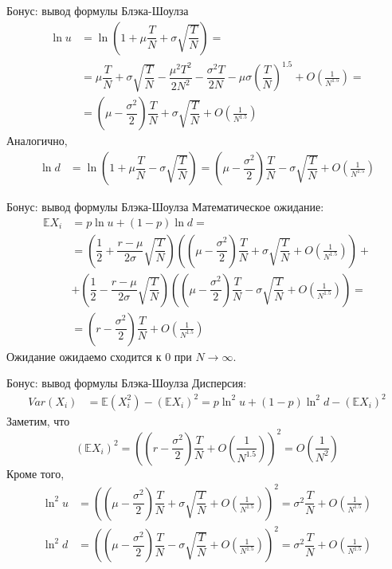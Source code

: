 \documentclass[pdf,12pt]{beamer}
\begin{document}
\begin{frame}{Бонус: вывод формулы Блэка-Шоулза}
\begin{align*}
\ln u &= \ln \left(1 + \mu \dfrac{T}{N} + \sigma\sqrt{\dfrac{T}{N}} \right) = \\ 
&=
\mu \dfrac{T}{N} + \sigma\sqrt{\dfrac{T}{N}} - \dfrac{\mu^2T^2}{2N^2} - \dfrac{\sigma^2T}{2N} - \mu\sigma\left(\dfrac{T}{N}\right)^{1.5} + O\left(\frac{1}{N^{1.5}}\right) = \\
&=  \left(\mu - \dfrac{\sigma^2}{2}\right)\dfrac{T}{N} + \sigma\sqrt{\dfrac{T}{N}} + O\left(\frac{1}{N^{1.5}}\right)
\end{align*}
Аналогично,
\begin{align*}
\ln d &= \ln \left(1 + \mu \dfrac{T}{N} - \sigma\sqrt{\dfrac{T}{N}} \right) = \left(\mu -\dfrac{\sigma^2}{2}\right)\dfrac{T}{N} -\sigma\sqrt{\dfrac{T}{N}} + O\left(\frac{1}{N^{1.5}}\right)
\end{align*}
\end{frame}

\begin{frame}{Бонус: вывод формулы Блэка-Шоулза}
Математическое ожидание:
\begin{align*}
\mathbb{E}X_i &= p\ln u + (1-p)\ln d = \\
&= \left( \dfrac{1}{2} + \dfrac{r -\mu}{2\sigma}\sqrt{\dfrac{T}{N}} \right)
\left(\left(\mu - \dfrac{\sigma^2}{2}\right)\dfrac{T}{N} + \sigma\sqrt{\dfrac{T}{N}} + O\left(\frac{1}{N^{1.5}}\right) \right) + \\
&+ \left( \dfrac{1}{2} - \dfrac{r -\mu}{2\sigma}\sqrt{\dfrac{T}{N}} \right)
\left(\left(\mu - \dfrac{\sigma^2}{2}\right)\dfrac{T}{N} -\sigma\sqrt{\dfrac{T}{N}} + O\left(\frac{1}{N^{1.5}}\right) \right) =\\
&= \left(r - \dfrac{\sigma^2}{2}\right)\dfrac{T}{N} + O\left(\frac{1}{N^{1.5}}\right)
\end{align*}
Ожидание ожидаемо сходится к $0$ при $N \to \infty$.
\end{frame}

\begin{frame}{Бонус: вывод формулы Блэка-Шоулза}
Дисперсия:
\begin{align*}
Var(X_i) &= \mathbb{E}(X_i^2) - (\mathbb{E}X_i)^2 =  p\ln^2u + (1-p)\ln^2d - (\mathbb{E}X_i)^2
\end{align*}
Заметим, что
\begin{equation*}
(\mathbb{E}X_i)^2 = \left(\left(r - \dfrac{\sigma^2}{2}\right)\dfrac{T}{N} + O\left(\frac{1}{N^{1.5}}\right)\right)^2 = O\left(\frac{1}{N^2}\right)
\end{equation*}
Кроме того, 
\begin{align*}
\ln^2 u &=  \left((\mu - \dfrac{\sigma^2}{2})\dfrac{T}{N} + \sigma\sqrt{\dfrac{T}{N}} + O\left(\frac{1}{N^{1.5}}\right)\right)^2 = \sigma^2\dfrac{T}{N} + O\left(\frac{1}{N^{1.5}}\right) \\
\ln^2 d &=  \left((\mu - \dfrac{\sigma^2}{2})\dfrac{T}{N} - \sigma\sqrt{\dfrac{T}{N}} + O\left(\frac{1}{N^{1.5}}\right)\right)^2 = \sigma^2\dfrac{T}{N} + O\left(\frac{1}{N^{1.5}}\right)
\end{align*}
\end{frame}
\end{document}
